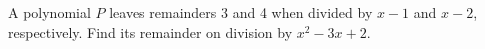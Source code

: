 A polynomial $P$ leaves remainders 3 and 4 when divided by $x-1$ and $x-2$, respectively. Find its remainder on division by $x^2-3x+2$.
